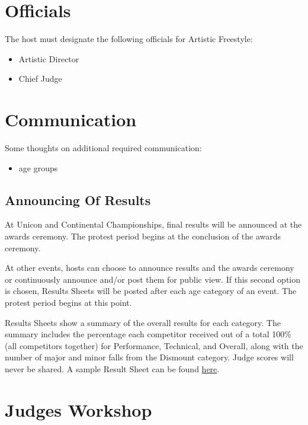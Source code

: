 \section{Officials}

The host must designate the following officials for Artistic Freestyle:
\begin{itemize}
	\item Artistic Director
	\item Chief Judge
\end{itemize}

\section{Communication}

\begin{comment2016}
	Some thoughts on additional required communication:
	\begin{itemize}
		\item age groups
	\end{itemize}
\end{comment2016}

\subsection{Announcing Of Results}

At Unicon and Continental Championships, final results will be announced at the awards ceremony.
The protest period begins at the conclusion of the awards ceremony.

At other events, hosts can choose to announce results and the awards ceremony or continuously announce and/or post them for public view.
If this second option is chosen, Results Sheets will be posted after each age category of an event.
The protest period begins at this point.

Results Sheets show a summary of the overall results for each category.
The summary includes the percentage each competitor received out of a total 100\% (all competitors together) for Performance, Technical, and Overall, along with the number of major and minor falls from the Dismount category.
Judge scores will never be shared.
A sample Result Sheet can be found \href{https://uniregistration.s3-us-west-2.amazonaws.com/naucc2017/uploads/competition_result/results_file/108/Club_Freestyle_freestyle_summary20170726-5550-jjk5ku.pdf}{here}.%

\section{Judges Workshop}

